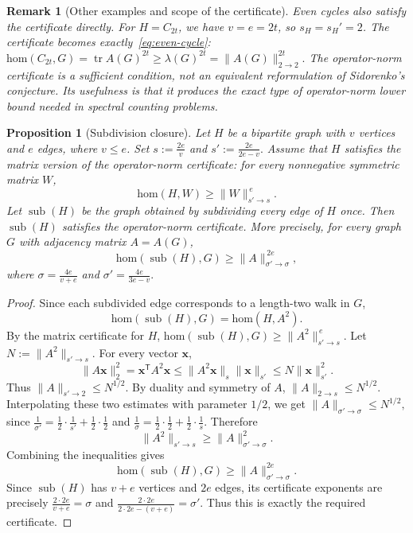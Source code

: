 \documentclass[10pt,a4paper]{amsart}
\newtheorem{proposition}[theorem]{Proposition}
\newtheorem{remark}{Remark}
\newcommand{\homc}{\mathrm{hom}}
\begin{document}
\begin{remark}[Other examples and scope of the certificate]
Even cycles also satisfy the certificate directly.  For \(H=C_{2t}\),
we have \(v=e=2t\), so \(s_H=s_H'=2\).  The certificate becomes exactly~\eqref{eq:even-cycle}: 
$        \homc(C_{2t},G)
        =
        \operatorname{tr}A(G)^{2t}
        \ge
        \lambda(G)^{2t}
        =
        \|A(G)\|_{2\to2}^{2t}.
$ The operator-norm certificate is a sufficient condition, not an
equivalent reformulation of Sidorenko's conjecture.  Its usefulness is
that it produces the exact type of operator-norm lower bound needed in
spectral counting problems.
\end{remark}

\begin{proposition}[Subdivision closure]
\label{prop:subdivision-closure-certificate}
Let \(H\) be a bipartite graph with \(v\) vertices and \(e\) edges, where
\(v\le e\).  Set $       s:=\frac{2e}{v}$ and 
$        s':=\frac{2e}{2e-v}.
$
Assume that \(H\) satisfies the matrix version of the operator-norm
certificate: for every nonnegative symmetric matrix \(W\),
\[
        \homc(H,W)\ge \|W\|_{s'\to s}^{\,e}.
\]
Let \(\operatorname{sub}(H)\) be the graph obtained by subdividing every
edge of \(H\) once.  Then \(\operatorname{sub}(H)\) satisfies the
operator-norm certificate.  More precisely, for every graph \(G\) with
adjacency matrix \(A=A(G)\),
\[
        \homc(\operatorname{sub}(H),G)
        \ge
        \|A\|_{\sigma'\to\sigma}^{\,2e},
\]
where        $\sigma=\frac{4e}{v+e}$ and 
$        \sigma'=\frac{4e}{3e-v}.
$
\end{proposition}

\begin{proof}
Since each subdivided edge corresponds to a length-two walk in \(G\),
\[
        \homc(\operatorname{sub}(H),G)=\homc(H,A^2).
\]
By the matrix certificate for \(H\),
$ \homc(\operatorname{sub}(H),G)
        \ge
        \|A^2\|_{s'\to s}^{\,e}.$
Let \(N:=\|A^2\|_{s'\to s}\).  For every vector \(\bm{x}\),
\[
        \|A\bm{x}\|_2^2
        =
        \bm{x}^{\mathsf T}A^2\bm{x}
        \le
        \|A^2\bm{x}\|_s\|\bm{x}\|_{s'}
        \le
        N\|\bm{x}\|_{s'}^2.
\]
Thus   $ \|A\|_{s'\to2}\le N^{1/2}.$
By duality and symmetry of \(A\),
$        \|A\|_{2\to s}\le N^{1/2}.
$
Interpolating these two estimates with parameter \(1/2\), we get $\|A\|_{\sigma'\to\sigma}\le N^{1/2},$
since
$\frac1{\sigma'}
        =
        \frac12\cdot\frac1{s'}
        +
        \frac12\cdot\frac12
$ and $\frac1{\sigma}
        =
        \frac12\cdot\frac12
        +
        \frac12\cdot\frac1s.$
Therefore
\[
        \|A^2\|_{s'\to s}\ge \|A\|_{\sigma'\to\sigma}^2.
\]
Combining the inequalities gives
\[
        \homc(\operatorname{sub}(H),G)
        \ge
        \|A\|_{\sigma'\to\sigma}^{2e}.
\]
Since \(\operatorname{sub}(H)\) has \(v+e\) vertices and \(2e\) edges, its certificate exponents are precisely
        $\frac{2\cdot 2e}{v+e}=\sigma$ and 
$        \frac{2\cdot 2e}{2\cdot 2e-(v+e)}=\sigma'.
$
Thus this is exactly the required certificate.
\end{proof}
\end{document}
